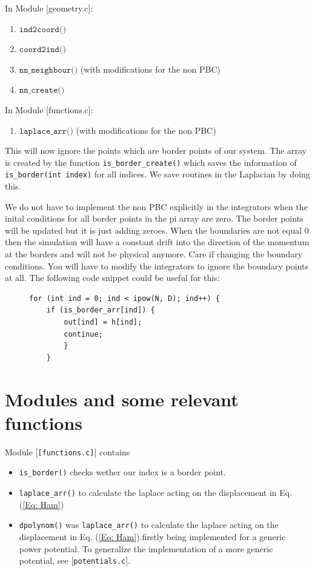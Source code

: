 \documentclass[11pt,a4paper]{article}
\begin{document}
In Module [geometry.c]:
\begin{enumerate}
    \item $\texttt{ind2coord()}$
    \item $\texttt{coord2ind()}$
	\item $\texttt{nn\_neighbour()}$ (with modifications for the non PBC)
    \item $\texttt{nn\_create()}$
\end{enumerate}
In Module [functions.c]:
\begin{enumerate}
	\item $\texttt{laplace\_arr()}$ (with modifications for the non PBC)
\end{enumerate}

This will now ignore the points which are border points of our system. The array
is created by the function \verb|is_border_create()| which saves the information of
\verb|is_border(int index)| for all indices. We save routines in the Laplacian by doing
this.

We do not have to implement the non PBC explicitly in the integrators when the
inital conditions for all border points in the pi array are zero. The border
points will be updated but it is just adding zeroes. When the boundaries are not
equal 0 then the simulation will have a constant drift into the direction of the
momentum at the borders and will not be physical anymore. Care if changing the
boundary conditions. You will have to modify the integrators to ignore the
boundary points at all. The following code snippet could be useful for this:

\begin{figure}[H]
	\begin{lstlisting}
for (int ind = 0; ind < ipow(N, D); ind++) {
	if (is_border_arr[ind]) {
		out[ind] = h[ind];
		continue;
		}
	}
	\end{lstlisting}
\end{figure}

\section{Modules and some relevant functions}

 Module [\verb|[functions.c]|] contains 
 \begin{itemize}
	 \item \verb|is_border()| checks wether our index is a border point.
	 \item  \verb|laplace_arr()| to calculate the laplace acting on the
		 displacement in Eq. (\ref{Eq: Ham})
	 \item \verb|dpolynom()| was \verb|laplace_arr()| to calculate the laplace
		 acting on the displacement in Eq. (\ref{Eq: Ham}).firstly being
		 implemented for a generic power potential. To generalize the
		 implementation of a more generic potential, see [\verb|potentials.c|].
 \end{itemize} 
\end{document}
